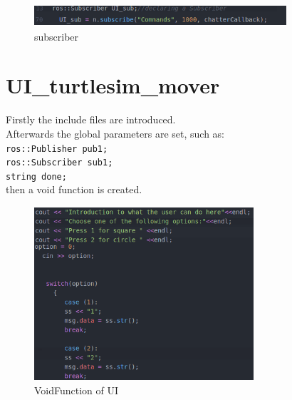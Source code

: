 \begin{figure}[h]
\begin{center}
\includegraphics[width=.9\textwidth]{figures/subscriber.png}
\caption{subscriber}
\end{center}
\end{figure}\label{fig:subscriber}


\section{UI\_turtlesim\_mover}

Firstly the include files are introduced.\\
Afterwards the global parameters are set, such as:\\
\texttt{ros::Publisher pub1;}\\
\texttt{ros::Subscriber sub1;}\\
\texttt{string done;}\\
then a void function is created.\\
\begin{figure}[h!]
\begin{center}
\includegraphics[width=.45\textwidth]{figures/switch.png}
\caption{VoidFunction of UI}
\end{center}
\end{figure}\label{fig:switch}

